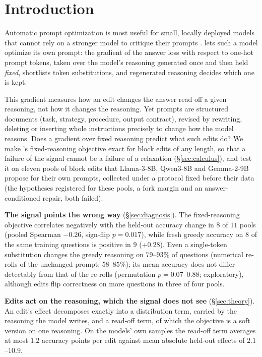 \section{Introduction}
\label{sec:intro}

Automatic prompt optimization is most useful for small, locally deployed models that cannot rely on
a stronger model to critique their prompts \citep{zhang2024revisiting}. \greater{}
\citep{das2025greater} lets such a model optimize its own prompt: the gradient of the answer loss
with respect to one-hot prompt tokens, taken over the model's reasoning generated once and then
held \emph{fixed}, shortlists token substitutions, and regenerated reasoning decides which one is
kept.

This gradient measures how an edit changes the answer read off a given reasoning, not how it
changes the reasoning. Yet prompts are structured documents (task, strategy, procedure, output
contract), revised by rewriting, deleting or inserting whole instructions precisely to change how
the model reasons. Does a gradient over fixed reasoning predict what such edits do? We make
\greater{}'s fixed-reasoning objective exact for block edits of any length, so that a failure of the
signal cannot be a failure of a relaxation (\S\ref{sec:calculus}), and test it on eleven pools of
block edits that Llama-3-8B, Qwen3-8B and Gemma-2-9B propose for their own prompts, collected under
a protocol fixed before their data (the hypotheses registered for these pools, a fork margin and an
answer-conditioned repair, both failed).

\textbf{The signal points the wrong way} (\S\ref{sec:diagnosis}). The fixed-reasoning objective
correlates negatively with the held-out accuracy change in $8$ of $11$ pools (pooled Spearman
$-0.26$, sign-flip $p=0.017$), while fresh greedy accuracy on $8$ of the same training questions is
positive in $9$ ($+0.28$). Even a single-token substitution changes the greedy reasoning on
$79$--$93\%$ of questions (numerical re-rolls of the unchanged prompt: $58$--$85\%$); its mean
accuracy does not differ detectably from that of the re-rolls (permutation $p=0.07$--$0.88$;
exploratory), although edits flip correctness on more questions in three of four pools.

\textbf{Edits act on the reasoning, which the signal does not see} (\S\ref{sec:theory}). An edit's
effect decomposes exactly into a distribution term, carried by the reasoning the model writes, and a
read-off term, of which the objective is a soft version on one reasoning. On the models' own
samples the read-off term averages at most $1.2$ accuracy points per edit against mean absolute
held-out effects of $2.1$--$10.9$.

